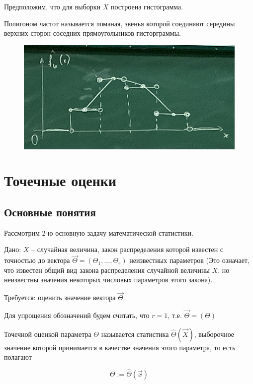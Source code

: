 Предположим, что для выборки $X$ построена гистограмма.

\begin{defenition}
    Полигоном частот называется ломаная, звенья которой соединяют
    середины верхних сторон соседних прямоугольников гисторграммы.
\end{defenition}

\begin{figure}[H]
    \centering
    \includegraphics[scale=0.8]{img/polygon.jpg}
\end{figure}

\section{Точечные оценки}

\subsection{Основные понятия}

Рассмотрим 2-ю основную задачу математической статистики.

Дано: $X$ -- случайная величина, закон распределения которой известен
с точностью до вектора $\vec \Theta = (\Theta_1, ..., \Theta_r)$
неизвестных параметров (Это означает, что известен общий вид
закона распределения случайной величины $X$, но неизвестны значения
некоторых числовых параметров этого закона).

Требуется: оценить значение вектора $\vec \Theta$.

Для упрощения обозначений будем считать, что
$r = 1$, т.е. $\vec \Theta = (\Theta)$

\begin{defenition}
    Точечной оценкой параметра $\Theta$ называется статистика
    $\hat \Theta(\vec X)$, выборочное значение которой принимается
    в качестве значения этого параметра, то есть полагают

    \begin{equation*}
        \Theta := \hat \Theta (\vec x)
    \end{equation*}
\end{defenition}

